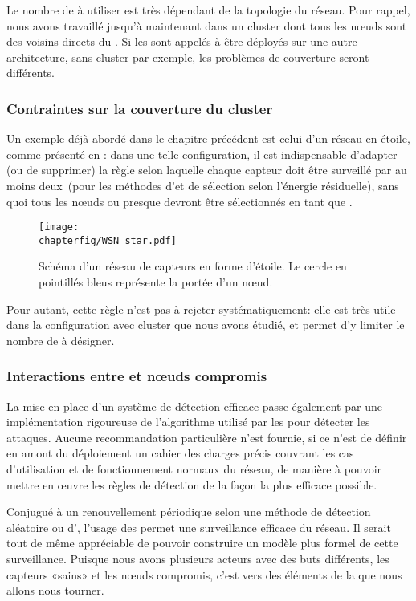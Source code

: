 Le nombre de \cns à utiliser est très dépendant de la topologie du réseau.
Pour rappel, nous avons travaillé jusqu'à maintenant dans un cluster dont tous les nœuds sont des voisins directs du \ch.
Si les \cns sont appelés à être déployés sur une autre architecture, sans cluster par exemple, les problèmes de couverture seront différents.

        \subsubsection{Contraintes sur la couverture du cluster}
Un exemple déjà abordé dans le chapitre précédent est celui d'un réseau en étoile, comme présenté en : dans une telle configuration, il est indispensable d'adapter (ou de supprimer) la règle selon laquelle chaque capteur doit être surveillé par au moins deux~\cns (pour les méthodes d'\elecdem et de sélection selon l'énergie résiduelle), sans quoi tous les nœuds ou presque devront être sélectionnés en tant que \cns.
\begin{figure}[!ht]
    \centering
    \texttt{[image: \\chapterfig/WSN\_star.pdf]}
    \caption[Schéma d'un réseau de capteurs en forme d'étoile]{Schéma d'un réseau de capteurs en forme d'étoile. Le cercle en pointillés bleus représente la portée d'un nœud.}\label{sd:fig:star}
\end{figure}
Pour autant, cette règle n'est pas à rejeter systématiquement: elle est très utile dans la configuration avec cluster que nous avons étudié, et permet d'y limiter le nombre de \cns à désigner.

        \subsubsection{Interactions entre \cns et nœuds compromis}
La mise en place d'un système de détection efficace passe également par une implémentation rigoureuse de l'algorithme utilisé par les \cns pour détecter les attaques.
Aucune recommandation particulière n'est fournie, si ce n'est de définir en amont du déploiement un cahier des charges précis couvrant les cas d'utilisation et de fonctionnement normaux du réseau, de manière à pouvoir mettre en œuvre les règles de détection de la façon la plus efficace possible.

Conjugué à un renouvellement périodique selon une méthode de détection aléatoire ou d'\elecdem, l'usage des \cns permet une surveillance efficace du réseau.
Il serait tout de même appréciable de pouvoir construire un modèle plus formel de cette surveillance.
Puisque nous avons plusieurs acteurs avec des buts différents, les capteurs «sains» et les nœuds compromis, c'est vers des éléments de la  que nous allons nous tourner.
